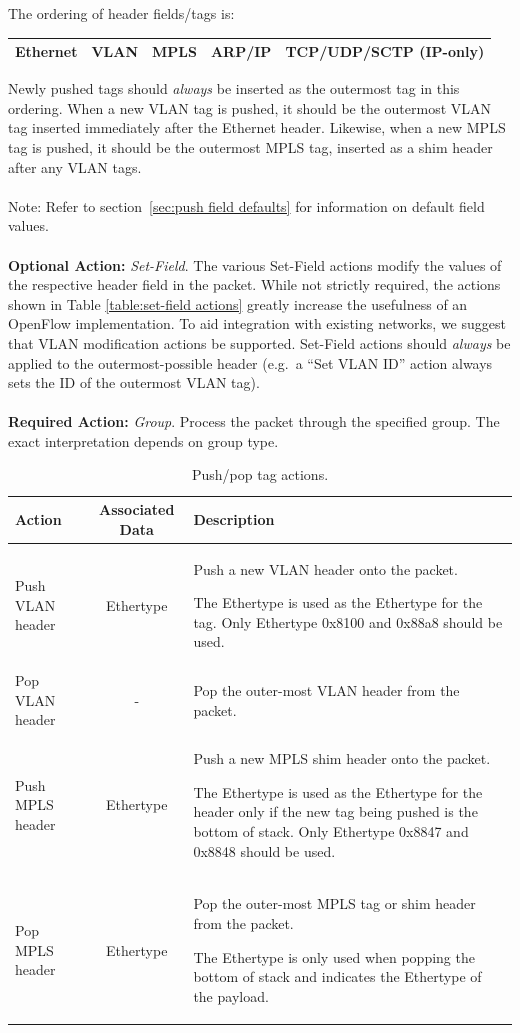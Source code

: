 \documentclass[10pt]{article}
\begin{document}
The ordering of header fields/tags is:
\begin{center}
\begin{tabular}{|l|l|l|l|l|}
\hline
Ethernet & VLAN & MPLS & ARP/IP & TCP/UDP/SCTP (IP-only) \\
\hline
\end{tabular}
\end{center}
Newly pushed tags should \emph{always} be inserted as the outermost tag in this ordering. When a new VLAN tag is pushed, it should be the outermost VLAN tag inserted immediately after the Ethernet header. Likewise, when a new MPLS tag is pushed, it should be the outermost MPLS tag, inserted as a shim header after any VLAN tags.
\\\\
Note: Refer to section~\ref{sec:push field defaults} for information on default field values.
\\\\
\textbf{Optional Action:} \emph{Set-Field}.  The various Set-Field actions modify the values of the respective header field in the packet. While not strictly required, the actions shown in Table \ref{table:set-field actions}  greatly increase the usefulness of an OpenFlow implementation.  To aid integration with existing networks, we suggest that VLAN modification actions be supported. Set-Field actions should \emph{always} be applied to the outermost-possible header (e.g.~a ``Set VLAN ID'' action always sets the ID of the outermost VLAN tag).
\\\\
\textbf{Required Action:} \emph{Group}.  Process the packet through the specified group.  The exact interpretation depends on group type. 

\begin{table}[hbp]
\centering
\footnotesize
\begin{tabularx}{\textwidth}{ |l|c|X| }
\hline
Action & Associated Data & Description \\
\hline
Push VLAN header &
Ethertype &
Push a new VLAN header onto the packet.

The Ethertype is used as the Ethertype for the tag. Only Ethertype 0x8100 and 0x88a8 should be used.
\\
\hline
Pop VLAN header &
- &
Pop the outer-most VLAN header from the packet. \\
\hline
Push MPLS header &
Ethertype &
Push a new MPLS shim header onto the packet.

The Ethertype is used as the Ethertype for the header only if the new tag being pushed is the bottom of stack. Only Ethertype 0x8847 and 0x8848 should be used.
\\
\hline
Pop MPLS header &
Ethertype &
Pop the outer-most MPLS tag or shim header from the packet.

The Ethertype is only used when popping the bottom of stack and indicates the Ethertype of the payload.
\\
\hline
\end{tabularx}
\caption{Push/pop tag actions.}
\label{table:push pop actions}
\end{table}
\end{document}
